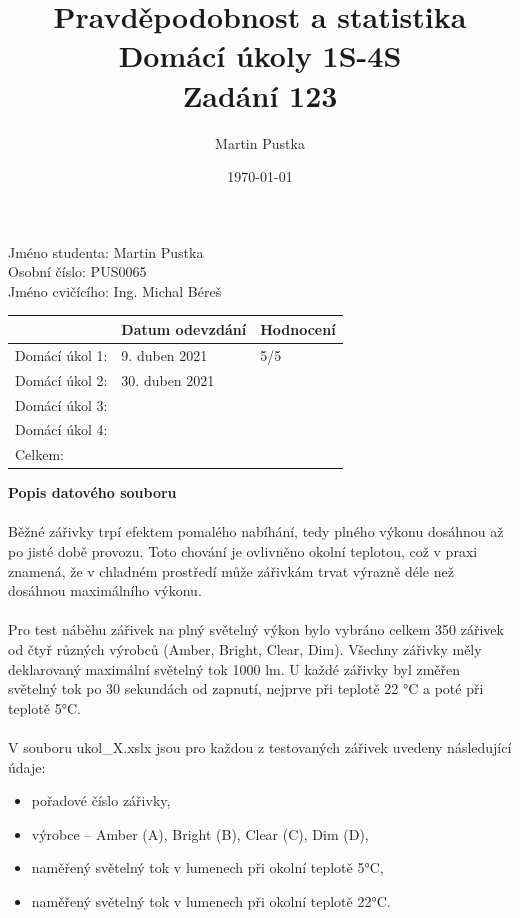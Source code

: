 \documentclass[czech]{article}%
\title{Pravděpodobnost a statistika\\
    \large Domácí úkoly 1S-4S\\
    \large Zadání 123}
\author{Martin Pustka}
\date{\today}
\begin{document}
\maketitle

\noindent
Jméno studenta: Martin Pustka\\
Osobní číslo: PUS0065\\
Jméno cvičícího: Ing. Michal Béreš\\

\begin{table}[!b]
    \centering
    \begin{tabular}{|l|p{5cm}|p{3cm}|}
        \hline
        & Datum odevzdání & Hodnocení \\
        \hline
        Domácí úkol 1: & 9. duben 2021 & 5/5 \\
        \hline
        Domácí úkol 2: & 30. duben 2021 & \\
        \hline
        Domácí úkol 3: & & \\
        \hline
        Domácí úkol 4: & & \\
        \hline
        Celkem: & & \\
        \hline
    \end{tabular}
\end{table}
\newpage
\tableofcontents
\newpage

\noindent
\textbf{Popis datového souboru}
\\\\
\noindent
Běžné zářivky trpí efektem pomalého nabíhání, tedy plného výkonu dosáhnou až po jisté době provozu. Toto chování je ovlivněno okolní teplotou, což v praxi znamená, že v chladném prostředí může zářivkám trvat výrazně déle než dosáhnou maximálního výkonu. 
\\\\
\noindent
Pro test náběhu zářivek na plný světelný výkon bylo vybráno celkem 350 zářivek od čtyř různých výrobců (Amber, Bright, Clear, Dim). Všechny zářivky měly deklarovaný maximální světelný tok 1000 lm. U každé zářivky byl změřen světelný tok po 30 sekundách od zapnutí, nejprve při teplotě 22 °C a poté při teplotě 5°C.
\\\\
\noindent
V souboru ukol\_X.xslx jsou pro každou z testovaných zářivek uvedeny následující údaje:
\begin{itemize}
    \item pořadové číslo zářivky,
    \item výrobce – Amber (A), Bright (B), Clear (C), Dim (D),
    \item naměřený světelný tok v lumenech při okolní teplotě 5°C,
    \item naměřený světelný tok v lumenech při okolní teplotě 22°C.
\end{itemize}
\end{document}
